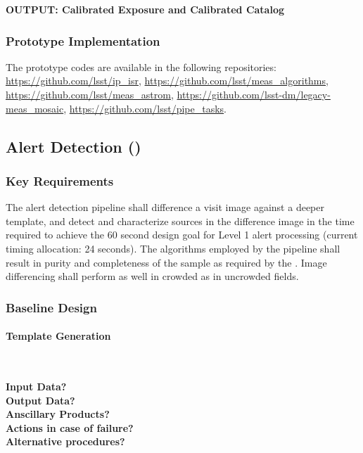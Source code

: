 \noindent
{\bf OUTPUT: Calibrated Exposure and Calibrated Catalog}

\subsubsection{Prototype Implementation}

The prototype codes are available in the following repositories: \url{https://github.com/lsst/ip_isr}, \url{https://github.com/lsst/meas_algorithms}, \url{https://github.com/lsst/meas_astrom}, \url{https://github.com/lsst-dm/legacy-meas_mosaic}, \url{https://github.com/lsst/pipe_tasks}.

\clearpage

\subsection{Alert Detection (\wbsDiffim)}

\subsubsection{Key Requirements}

The alert detection pipeline shall difference a visit image against a deeper template, and detect and characterize sources in the difference image in the time required to achieve the 60 second design goal for Level 1 alert processing (current timing allocation: 24 seconds). The algorithms employed by the pipeline shall result in purity and completeness of the sample as required by the \DMSR\@. Image differencing shall perform as well in crowded as in uncrowded fields.

\subsubsection{Baseline Design}
\label{sec:diffimDesign}

\paragraph{Template Generation}~

\noindent
{\bf Input Data?}\\
{\bf Output Data?}\\
{\bf Anscillary Products?}\\
{\bf Actions in case of failure?}\\
{\bf Alternative procedures?}\\

